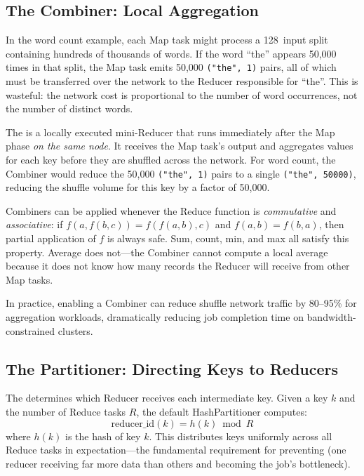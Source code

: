 \subsection{The Combiner: Local Aggregation}
\label{subsec:combiner}

In the word count example, each Map task might process a 128\MB\ input
split containing hundreds of thousands of words. If the word ``the''
appears 50,000 times in that split, the Map task emits 50,000
\texttt{("the", 1)} pairs, all of which must be transferred over the
network to the Reducer responsible for ``the''. This is wasteful: the
network cost is proportional to the number of word occurrences, not
the number of distinct words.

The  is a locally executed mini-Reducer that runs
immediately after the Map phase \emph{on the same node}. It receives
the Map task's output and aggregates values for each key before they
are shuffled across the network. For word count, the Combiner
would reduce the 50,000 \texttt{("the", 1)} pairs to a single
\texttt{("the", 50000)}, reducing the shuffle volume for this key
by a factor of 50,000.

Combiners can be applied whenever the Reduce function is
\emph{commutative} and \emph{associative}: if $f(a, f(b, c)) = f(f(a, b), c)$
and $f(a, b) = f(b, a)$, then partial application of $f$ is always
safe. Sum, count, min, and max all satisfy this property. Average does
not---the Combiner cannot compute a local average because it does not
know how many records the Reducer will receive from other Map tasks.

In practice, enabling a Combiner can reduce shuffle network traffic
by 80--95\% for aggregation workloads, dramatically reducing job
completion time on bandwidth-constrained clusters.

\subsection{The Partitioner: Directing Keys to Reducers}
\label{subsec:partitioner}

The  determines which Reducer receives each
intermediate key. Given a key $k$ and the number of Reduce tasks $R$,
the default HashPartitioner computes:
\begin{equation}
\text{reducer\_id}(k) = h(k) \bmod R
\label{eq:hash-partitioner}
\end{equation}
where $h(k)$ is the hash of key $k$. This distributes keys uniformly
across all Reduce tasks in expectation---the fundamental requirement
for preventing  (one reducer receiving far more
data than others and becoming the job's bottleneck).

